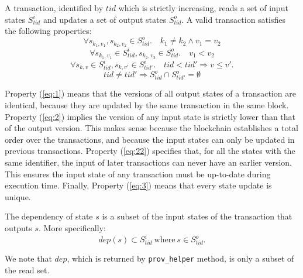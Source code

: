 \begin{definition}
A transaction, identified by ${tid}$ which is strictly increasing, reads a set of input states $S^{i}_{tid}$ 
and updates a set of output states $S^{o}_{tid}$. 
A valid transaction satisfies the following properties: 
  \begin{equation}
    \label{eq:1} \forall s_{k_1,v_1}, s_{k_2,v_2} \in S^{o}_{tid}. \quad k_1 \ne k_2
    \land v_1 = v_2 
  \end{equation}
  \begin{equation}\label{eq:2}
    \forall s_{k_1,v_1} \in S^{i}_{tid}, s_{k_2,v_2} \in S^{o}_{tid}. \quad v_1 < v_2 
  \end{equation}
  \begin{equation}\label{eq:22}
    \forall s_{k,v} \in S^{i}_{tid},  s_{k,v'} \in S^{i}_{tid'}. \quad tid < tid' \Rightarrow v \le v'. 
  \end{equation}
  \begin{equation}\label{eq:3}
    tid \ne tid' \Rightarrow S^{o}_{tid} \cap S^{o}_{tid'} = \emptyset
  \end{equation}
\end{definition}

Property (\ref{eq:1}) means that the versions of all output states of a transaction are identical, 
because they are updated by the same transaction in the same block. 
Property (\ref{eq:2}) implies the version of any input state is strictly lower than
that of the output version. This makes sense because the blockchain establishes a total order over the
transactions, and because the input states can only be updated in previous transactions. 
Property (\ref{eq:22}) specifies that, for all the states with the same identifier, the input of later
transactions can never have an earlier version.  This ensures the input state of any transaction must be
up-to-date during execution time.  Finally, Property (\ref{eq:3}) means that every state update is  unique. 

\begin{definition}
The dependency of state $s$ is a subset of the input states of the transaction that outputs $s$. More
specifically: 
  \begin{displaymath}
    dep(s) \subset S^{i}_{tid} \ \text{where} \ s \in S^{o}_{tid}. 
  \end{displaymath}
\end{definition}
\noindent We note that $dep$, which is returned by \texttt{prov\_helper} method, is only a subset of the read
set.  

